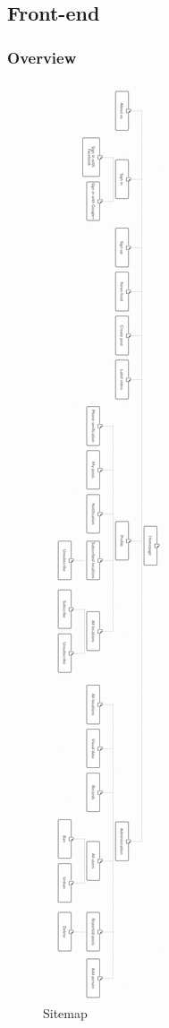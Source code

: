 \subsection{Front-end}
\subsubsection{Overview}
\begin{center}
    \begin{figure}[H]
    \centering
    \includegraphics[width=0.16\columnwidth]{images/chap4/sitemap.png}
    \caption{Sitemap}
    \end{figure}
\end{center}
